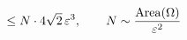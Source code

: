 \documentclass[preview]{standalone}
\begin{document}
\begin{align*}
\special{dvisvgm:raw <g id='unique000'>}\le N \cdot 4\sqrt{2}\,\varepsilon^{3}, \qquad N \sim \frac{\mathrm{Area}(\Omega)}{\varepsilon^{2}}\special{dvisvgm:raw </g>}
\end{align*}
\end{document}
